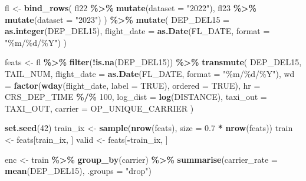 \documentclass[
]{article}
\newenvironment{Shaded}{\begin{snugshade}}{\end{snugshade}}
\newcommand{\AttributeTok}[1]{\textcolor[rgb]{0.13,0.29,0.53}{#1}}
\newcommand{\ConstantTok}[1]{\textcolor[rgb]{0.56,0.35,0.01}{#1}}
\newcommand{\DecValTok}[1]{\textcolor[rgb]{0.00,0.00,0.81}{#1}}
\newcommand{\FloatTok}[1]{\textcolor[rgb]{0.00,0.00,0.81}{#1}}
\newcommand{\FunctionTok}[1]{\textcolor[rgb]{0.13,0.29,0.53}{\textbf{#1}}}
\newcommand{\NormalTok}[1]{#1}
\newcommand{\OtherTok}[1]{\textcolor[rgb]{0.56,0.35,0.01}{#1}}
\newcommand{\SpecialCharTok}[1]{\textcolor[rgb]{0.81,0.36,0.00}{\textbf{#1}}}
\newcommand{\StringTok}[1]{\textcolor[rgb]{0.31,0.60,0.02}{#1}}
\begin{document}
\begin{Shaded}
\begin{Highlighting}[]
\NormalTok{fl }\OtherTok{\textless{}{-}} \FunctionTok{bind\_rows}\NormalTok{(}
\NormalTok{  fl22 }\SpecialCharTok{\%\textgreater{}\%} \FunctionTok{mutate}\NormalTok{(}\AttributeTok{dataset =} \StringTok{"2022"}\NormalTok{),}
\NormalTok{  fl23 }\SpecialCharTok{\%\textgreater{}\%} \FunctionTok{mutate}\NormalTok{(}\AttributeTok{dataset =} \StringTok{"2023"}\NormalTok{)}
\NormalTok{) }\SpecialCharTok{\%\textgreater{}\%}
  \FunctionTok{mutate}\NormalTok{(}
    \AttributeTok{DEP\_DEL15   =} \FunctionTok{as.integer}\NormalTok{(DEP\_DEL15),}
    \AttributeTok{flight\_date =} \FunctionTok{as.Date}\NormalTok{(FL\_DATE, }\AttributeTok{format =} \StringTok{"\%m/\%d/\%Y"}\NormalTok{)}
\NormalTok{  )}

\NormalTok{feats }\OtherTok{\textless{}{-}}\NormalTok{ fl }\SpecialCharTok{\%\textgreater{}\%}
  \FunctionTok{filter}\NormalTok{(}\SpecialCharTok{!}\FunctionTok{is.na}\NormalTok{(DEP\_DEL15)) }\SpecialCharTok{\%\textgreater{}\%}
  \FunctionTok{transmute}\NormalTok{(}
\NormalTok{    DEP\_DEL15,}
\NormalTok{    TAIL\_NUM,}
    \AttributeTok{flight\_date =} \FunctionTok{as.Date}\NormalTok{(FL\_DATE, }\AttributeTok{format =} \StringTok{"\%m/\%d/\%Y"}\NormalTok{),}
    \AttributeTok{wd          =} \FunctionTok{factor}\NormalTok{(}\FunctionTok{wday}\NormalTok{(flight\_date, }\AttributeTok{label =} \ConstantTok{TRUE}\NormalTok{), }\AttributeTok{ordered =} \ConstantTok{TRUE}\NormalTok{),}
    \AttributeTok{hr          =}\NormalTok{ CRS\_DEP\_TIME }\SpecialCharTok{\%/\%} \DecValTok{100}\NormalTok{,}
    \AttributeTok{log\_dist    =} \FunctionTok{log}\NormalTok{(DISTANCE),}
    \AttributeTok{taxi\_out    =}\NormalTok{ TAXI\_OUT,}
    \AttributeTok{carrier     =}\NormalTok{ OP\_UNIQUE\_CARRIER}
\NormalTok{  )}

\FunctionTok{set.seed}\NormalTok{(}\DecValTok{42}\NormalTok{)}
\NormalTok{train\_ix }\OtherTok{\textless{}{-}} \FunctionTok{sample}\NormalTok{(}\FunctionTok{nrow}\NormalTok{(feats), }\AttributeTok{size =} \FloatTok{0.7} \SpecialCharTok{*} \FunctionTok{nrow}\NormalTok{(feats))}
\NormalTok{train    }\OtherTok{\textless{}{-}}\NormalTok{ feats[train\_ix, ]}
\NormalTok{valid    }\OtherTok{\textless{}{-}}\NormalTok{ feats[}\SpecialCharTok{{-}}\NormalTok{train\_ix, ]}

\NormalTok{enc }\OtherTok{\textless{}{-}}\NormalTok{ train }\SpecialCharTok{\%\textgreater{}\%}
  \FunctionTok{group\_by}\NormalTok{(carrier) }\SpecialCharTok{\%\textgreater{}\%}
  \FunctionTok{summarise}\NormalTok{(}\AttributeTok{carrier\_rate =} \FunctionTok{mean}\NormalTok{(DEP\_DEL15), }\AttributeTok{.groups =} \StringTok{"drop"}\NormalTok{)}


\end{Highlighting}
\end{Shaded}
\end{document}

